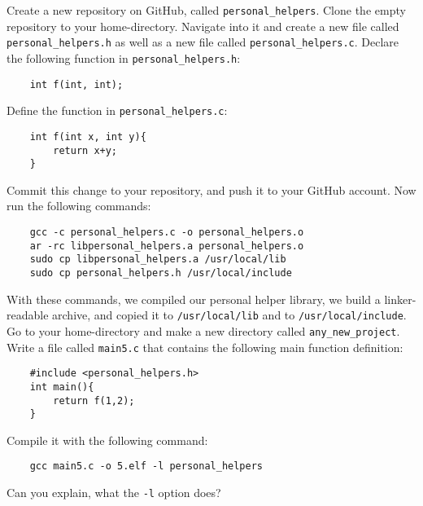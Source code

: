 \documentclass{dcbl/challenge}
\begin{document}
\begin{aufgabe}
    Create a new repository on GitHub, called \texttt{personal\_helpers}.
    Clone the empty repository to your home-directory.
    Navigate into it and create a new file called \texttt{personal\_helpers.h} as well as a new file called \texttt{personal\_helpers.c}.
    Declare the following function in \texttt{personal\_helpers.h}:
    \begin{lstlisting}
    int f(int, int);
    \end{lstlisting}
    Define the function in \texttt{personal\_helpers.c}:
    \begin{lstlisting}
    int f(int x, int y){
        return x+y;
    }
    \end{lstlisting}
    Commit this change to your repository, and push it to your GitHub account.
    Now run the following commands:
    \begin{lstlisting}
    gcc -c personal_helpers.c -o personal_helpers.o
    ar -rc libpersonal_helpers.a personal_helpers.o
    sudo cp libpersonal_helpers.a /usr/local/lib
    sudo cp personal_helpers.h /usr/local/include
    \end{lstlisting}
    With these commands, we compiled our personal helper library, we build a linker-readable archive, and copied it to \texttt{/usr/local/lib} and to \texttt{/usr/local/include}.
    Go to your home-directory and make a new directory called \texttt{any\_new\_project}.
    Write a file called \texttt{main5.c} that contains the following main function definition:
    \begin{lstlisting}
    #include <personal_helpers.h>
    int main(){
        return f(1,2);
    }
    \end{lstlisting}
    Compile it with the following command:
    \begin{lstlisting}
    gcc main5.c -o 5.elf -l personal_helpers
    \end{lstlisting}
    Can you explain, what the \texttt{-l} option does?
\end{aufgabe}
\end{document}
